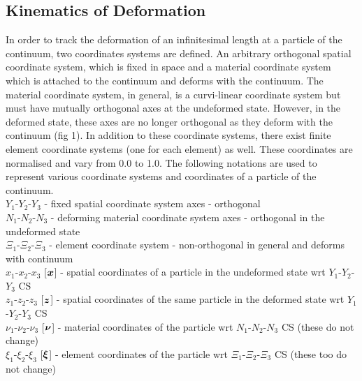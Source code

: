 \subsection{Kinematics of Deformation}
In order to track the deformation of an infinitesimal length at a particle of
the continuum, two coordinates systems are defined. An arbitrary orthogonal
spatial coordinate system, which is fixed in space and a material coordinate
system which is attached to the continuum and deforms with the continuum. The
material coordinate system, in general, is a curvi-linear coordinate system
but must have mutually orthogonal axes at the undeformed state. However, in
the deformed state, these axes are no longer orthogonal as they deform with
the continuum (fig 1). In addition to these coordinate systems, there exist
finite element coordinate systems (one for each element) as well. These
coordinates are normalised and vary from 0.0 to 1.0. The following notations are used to represent various coordinate systems and coordinates of a particle of the continuum.\\

\noindent $Y_{1}$-$Y_{2}$-$Y_{3}$ - fixed spatial coordinate system axes - orthogonal\\
$N_{1}$-$N_{2}$-$N_{3}$ - deforming material coordinate system axes  - orthogonal in the undeformed state\\
$\Xi_{1}$-$\Xi_{2}$-$\Xi_{3}$ - element coordinate system - non-orthogonal in general and deforms with continuum\\

\noindent $x_{1}$-$x_{2}$-$x_{3}$ [$\vect{x}$] - spatial coordinates of a particle in the undeformed state wrt $Y_{1}$-$Y_{2}$-$Y_{3}$ CS \\
$z_{1}$-$z_{2}$-$z_{3}$ [$\vect{z}$] - spatial coordinates of the same particle in the deformed state wrt $Y_{1}$-$Y_{2}$-$Y_{3}$ CS \\
$\nu_{1}$-$\nu_{2}$-$\nu_{3}$ [$\vect{\nu}$] - material coordinates of the particle wrt $N_{1}$-$N_{2}$-$N_{3}$ CS (these do not change) \\
$\xi_{1}$-$\xi_{2}$-$\xi_{3}$ [$\vect{\xi}$] - element coordinates of the particle wrt $\Xi_{1}$-$\Xi_{2}$-$\Xi_{3}$ CS (these too do not change)\\

